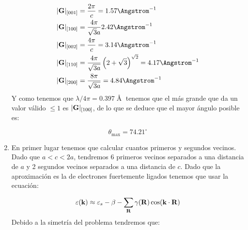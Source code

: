 \begin{solucion}
\begin{enumerate}[label=\alph*)]
		\begin{align*}
			|\Gn|_{[001]} & = \frac{2\pi}{c} = 1.57 \unit{\Angstrom^{-1}} \\ 
			|\Gn|_{[100]} & = \frac{4\pi}{\sqrt{3}a} 2.42\unit{\Angstrom^{-1}}   \\ 
			|\Gn|_{[002]} & = \frac{4\pi}{c} = 3.14 \unit{\Angstrom^{-1}}  \\  
			|\Gn|_{[110]} & = \frac{4 \pi }{\sqrt{3a}} \parentesis{2+\sqrt{3}}^{\sqrt{2}} = 4.17 \unit{\Angstrom^{-1}} \\  
			|\Gn|_{[200]} & = \frac{8 \pi }{\sqrt{3a}} = 4.84 \unit{\Angstrom^{-1}} \\  
		\end{align*} 
		Y como tenemos que $\lambda/4\pi= 0.397 \unit{\Angstrom}$ tenemos que el más grande que da un valor válido $\leq 1$ es $|\mathbf{G}|_{[100]}$, de lo que se deduce que el mayor ángulo posible es:
		
		\begin{equation*}
			\theta_{\max} = 74.21 ^\circ
		\end{equation*}
		
		 \item En primer lugar tenemos que calcular cuantos primeros y segundos vecinos. Dado que $a<c<2a$, tendremos 6 primeros vecinos separados a una distancia de $a$ y 2 segundos vecinos separados a una distancia de $c$. Dado que la aproximación es la de electrones fuertemente ligados tenemos que usar la ecuación:
		 
		 \begin{equation*}
		 	\varepsilon(\mathbf{k}) \approx \varepsilon_s - \beta - \sum_{\mathbf{R}} \gamma (\mathbf{R}) \cos (\mathbf{k} \cdot \mathbf{R})
		 \end{equation*}
		 Debido a la simetría del problema tendremos que: 
		 

\end{enumerate}
\end{solucion}
